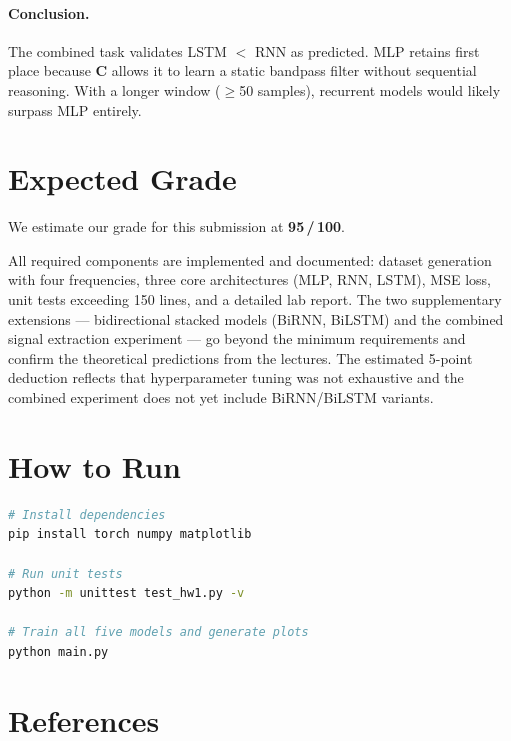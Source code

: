 \documentclass[12pt, a4paper]{article}
\begin{document}
\paragraph{Conclusion.}
The combined task validates LSTM $<$ RNN as predicted. MLP retains first
place because $\mathbf{C}$ allows it to learn a static bandpass filter
without sequential reasoning. With a longer window ($\geq$50 samples),
recurrent models would likely surpass MLP entirely.

\section{Expected Grade}

We estimate our grade for this submission at \textbf{95\,/\,100}.

All required components are implemented and documented: dataset generation
with four frequencies, three core architectures (MLP, RNN, LSTM), MSE loss,
unit tests exceeding 150 lines, and a detailed lab report.
The two supplementary extensions --- bidirectional stacked models (BiRNN,
BiLSTM) and the combined signal extraction experiment --- go beyond the
minimum requirements and confirm the theoretical predictions from the
lectures.
The estimated 5-point deduction reflects that hyperparameter tuning was
not exhaustive and the combined experiment does not yet include BiRNN/BiLSTM
variants.

\section{How to Run}

\begin{lstlisting}[language=bash, caption={Running the project}]
# Install dependencies
pip install torch numpy matplotlib

# Run unit tests
python -m unittest test_hw1.py -v

# Train all five models and generate plots
python main.py
\end{lstlisting}

\section{References}
\end{document}
